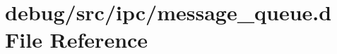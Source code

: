 \hypertarget{message__queue_8d}{
\section{debug/src/ipc/message\_\-queue.d File Reference}
\label{message__queue_8d}
}
